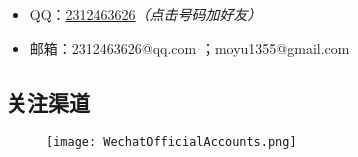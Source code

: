 \documentclass[11pt,a4paper,UTF8,titlepage]{ctexart} %
\begin{document}
    \begin{itemize}
        \item QQ：\href{tencent://AddContact/?fromId=45&fromSubId=1&subcmd=all&uin=2312463626&website=www.oicqzone.com}{2312463626}\emph{\color{red}（点击号码加好友）}
        \item 邮箱：2312463626@qq.com ；moyu1355@gmail.com
    \end{itemize}

    \subsection*{\bfseries \sffamily \hypertarget{follow}{关注渠道}}
    \vspace*{-1ex}
    \vspace*{-2ex}

    \begin{figure}[htbp]
        \centering
        \texttt{[image: WechatOfficialAccounts.png]}
    \end{figure}
    \vspace*{-4ex}
\end{document}
